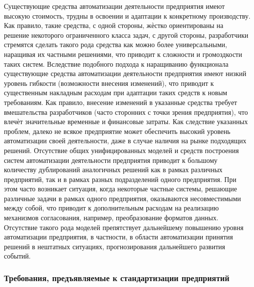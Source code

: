 Существующие средства автоматизации деятельности предприятия имеют высокую стоимость, трудны в освоении и адаптации к конкретному производству. Как правило, такие
средства, с одной стороны, жѐстко ориентированы на решение некоторого ограниченного
класса задач, с другой стороны, разработчики стремятся сделать такого рода средства как
можно более универсальными, наращивая их частными решениями, что приводит к сложности и громоздкости таких систем. Вследствие подобного подхода к наращиванию функционала существующие средства автоматизации деятельности предприятия имеют низкий уровень гибкости (возможности внесения изменений), что приводит к существенным накладным
расходам при адаптации таких средств к новым требованиям. Как правило, внесение изменений в указанные средства требует вмешательства разработчиков (часто сторонних с точки
зрения предприятия), что влечѐт значительные временные и финансовые затраты. Как следствие указанных проблем, далеко не всякое предприятие может обеспечить высокий уровень
автоматизации своей деятельности, даже в случае наличия на рынке подходящих решений.
Отсутствие общих унифицированных моделей и средств построения систем автоматизации деятельности предприятия приводит к большому количеству дублирований аналогичных
решений как в рамках различных предприятий, так и в рамках разных подразделений одного
предприятия. При этом часто возникает ситуация, когда некоторые частные системы, решающие различные задачи в рамках одного предприятия, оказываются несовместимыми между
собой, что приводит к дополнительным расходам на реализацию механизмов согласования,
например, преобразование форматов данных. Отсутствие такого рода моделей препятствует
дальнейшему повышению уровня автоматизации предприятия, в частности, в области автоматизации принятия решений в нештатных ситуациях, прогнозирования дальнейшего развития событий.

\subsubsection{Требования, предъявляемые к стандартизации предприятий}

